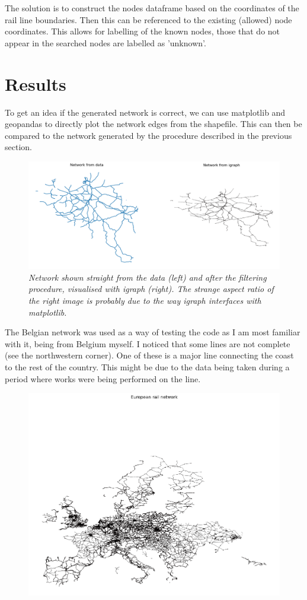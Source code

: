 The solution is to construct the nodes dataframe based on the coordinates of the rail line boundaries. Then this can be referenced to the existing (allowed) node coordinates. This allows for labelling of the known nodes, those that do not appear in the searched nodes are labelled as 'unknown'.

\section{Results}

To get an idea if the generated network is correct, we can use matplotlib and geopandas to directly plot the network edges from the shapefile. This can then be compared to the network generated by the procedure described in the previous section.

\begin{figure}[H]
    \centering
    \includegraphics[width=\linewidth]{images/Comparison.png}
    \caption{\textit{Network shown straight from the data (left) and after the filtering procedure, visualised with igraph (right). The strange aspect ratio of the right image is probably due to the way igraph interfaces with matplotlib.}}
    \label{rail_comparison}
\end{figure}

The Belgian network was used as a way of testing the code as I am most familiar with it, being from Belgium myself. I noticed that some lines are not complete (see the northwestern corner). One of these is a major line connecting the coast to the rest of the country. This might be due to the data being taken during a period where works were being performed on the line.

\newpage

\begin{figure}[H]
    \centering
    \includegraphics[width=\linewidth]{images/Europe_rail.png}
\end{figure}

\newpage